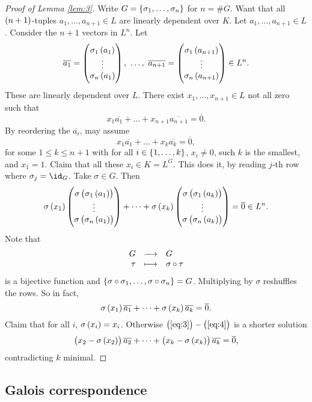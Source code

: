 \begin{proof}[Proof of Lemma \ref{lem:3}]
Write $ G = \cbr{\sigma_1, \dots, \sigma_n} $ for $ n = \#G $. Want that all $ \br{n + 1} $-tuples $ a_1, \dots, a_{n + 1} \in L $ are linearly dependent over $ K $. Let $ a_1, \dots, a_{n + 1} \in L $. Consider the $ n + 1 $ vectors in $ L^n $. Let
$$ \overline{a_1} = \threebyone{\sigma_1\br{a_1}}{\vdots}{\sigma_n\br{a_1}}, \ \dots, \ \overline{a_{n + 1}} = \threebyone{\sigma_1\br{a_{n + 1}}}{\vdots}{\sigma_n\br{a_{n + 1}}} \in L^n. $$
These are linearly dependent over $ L $. There exist $ x_1, \dots, x_{n + 1} \in L $ not all zero such that
$$ x_1\overline{a_1} + \dots + x_{n + 1}\overline{a_{n + 1}} = \overline{0}. $$
By reordering the $ \overline{a_i} $, may assume
\begin{equation}
\label{eq:3}
x_1\overline{a_1} + \dots + x_k\overline{a_k} = \overline{0},
\end{equation}
for some $ 1 \le k \le n + 1 $ with for all $ i \in \cbr{1, \dots, k} $, $ x_i \ne 0 $, such $ k $ is the smallest, and $ x_1 = 1 $. Claim that all these $ x_i \in K = L^G $. This does it, by reading $ j $-th row where $ \sigma_j = \id_G $. Take $ \sigma \in G $. Then
$$ \sigma\br{x_1}\threebyone{\sigma\br{\sigma_1\br{a_1}}}{\vdots}{\sigma\br{\sigma_n\br{a_1}}} + \dots + \sigma\br{x_k}\threebyone{\sigma\br{\sigma_1\br{a_k}}}{\vdots}{\sigma\br{\sigma_n\br{a_k}}} = \overline{0} \in L^n. $$
Note that
$$ \function{G}{G}{\tau}{\sigma \circ \tau} $$
is a bijective function and $ \cbr{\sigma \circ \sigma_1, \dots, \sigma \circ \sigma_n} = G $. Multiplying by $ \sigma $ reshuffles the rows. So in fact,
\begin{equation}
\label{eq:4}
\sigma\br{x_1}\overline{a_1} + \dots + \sigma\br{x_k}\overline{a_k} = \overline{0}.
\end{equation}
Claim that for all $ i $, $ \sigma\br{x_i} = x_i $. Otherwise $ \br{\ref{eq:3}} - \br{\ref{eq:4}} $ is a shorter solution
$$ \br{x_2 - \sigma\br{x_2}}\overline{a_2} + \dots + \br{x_k - \sigma\br{x_k}}\overline{a_k} = \overline{0}, $$
contradicting $ k $ minimal.
\end{proof}

\subsection{Galois correspondence}

